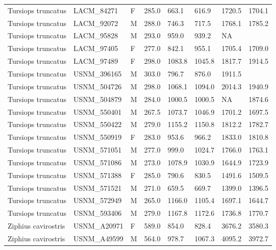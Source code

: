 \begin{longtable}{|p{1.95in}p{1.1in}p{.15in}p{.4in}p{.4in}p{.4in}p{.4in}p{.4in}|}
  Tursiops truncatus & LACM\_84271 & F & 285.0 & 663.1 & 616.9 & 1720.5 & 1704.1 \\ 
  Tursiops truncatus & LACM\_92072 & M & 288.0 & 746.3 & 717.5 & 1768.1 & 1785.2 \\ 
  Tursiops truncatus & LACM\_95828 & M & 293.0 & 959.0 & 939.2 & NA &  \\ 
  Tursiops truncatus & LACM\_97405 & F & 277.0 & 842.1 & 955.1 & 1705.4 & 1709.0 \\ 
  Tursiops truncatus & LACM\_97489 & F & 298.0 & 1083.8 & 1045.8 & 1817.7 & 1914.5 \\ 
  Tursiops truncatus & USNM\_396165 & M & 303.0 & 796.7 & 876.0 & 1911.5 &  \\ 
  Tursiops truncatus & USNM\_504726 & M & 298.0 & 1068.1 & 1094.0 & 2014.3 & 1940.9 \\ 
  Tursiops truncatus & USNM\_504879 & M & 284.0 & 1000.5 & 1000.5 & NA & 1874.6 \\ 
  Tursiops truncatus & USNM\_550401 & M & 267.5 & 1073.7 & 1046.9 & 1701.2 & 1697.5 \\ 
  Tursiops truncatus & USNM\_550422 & M & 279.0 & 1155.2 & 1150.8 & 1812.2 & 1782.7 \\ 
  Tursiops truncatus & USNM\_550919 & F & 283.0 & 953.6 & 966.2 & 1833.0 & 1810.8 \\ 
  Tursiops truncatus & USNM\_571051 & M & 277.0 & 999.0 & 1024.7 & 1766.0 & 1763.1 \\ 
  Tursiops truncatus & USNM\_571086 & M & 273.0 & 1078.9 & 1030.9 & 1644.9 & 1723.9 \\ 
  Tursiops truncatus & USNM\_571388 & F & 285.0 & 790.6 & 830.5 & 1491.6 & 1509.5 \\ 
  Tursiops truncatus & USNM\_571521 & M & 271.0 & 659.5 & 669.7 & 1399.0 & 1396.5 \\ 
  Tursiops truncatus & USNM\_572949 & M & 265.0 & 1166.0 & 1105.4 & 1697.1 & 1644.7 \\ 
  Tursiops truncatus & USNM\_593406 & M & 279.0 & 1167.8 & 1172.6 & 1736.8 & 1770.7 \\ 
  Ziphius cavirostris & USNM\_A20971 & F & 589.0 & 854.0 & 828.4 & 3676.2 & 3580.3 \\ 
  Ziphius cavirostris & USNM\_A49599 & M & 564.0 & 978.7 & 1067.3 & 4095.2 & 3972.7 \\ 
   \hline
\end{longtable}

\normalfont
